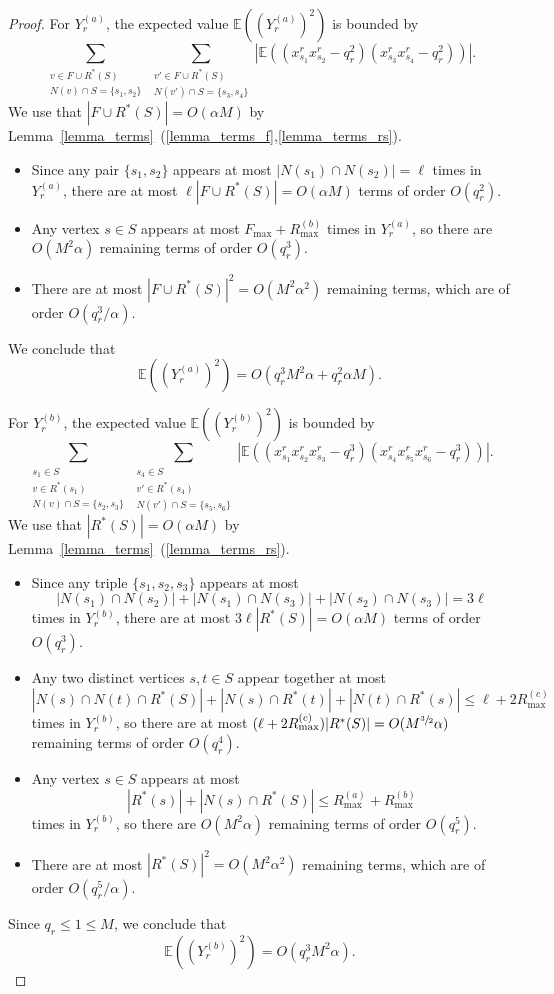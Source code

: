 \documentclass{article}
\theoremstyle{plain}
\theoremstyle{remark}
\theoremstyle{plain}
\numberwithin{equation}{section}
\begin{document}
\begin{proof}
		For $Y_r^{(a)}$, the expected value $\mathbb{E}((Y_r^{(a)})^2)$ is bounded by $$\sum_{\substack{v\in F\cup R^*(S)\\N(v)\cap S=\{s_1,s_2\}}}\sum_{\substack{v'\in F\cup R^*(S)\\N(v')\cap S=\{s_3,s_4\}}}|\mathbb{E}((x_{s_1}^rx_{s_2}^r-q_r^2)(x_{s_3}^rx_{s_4}^r-q_r^2))|.$$ We use that $|F\cup R^*(S)|=O(\alpha M)$ by Lemma~\ref{lemma_terms}~(\ref{lemma_terms_f},\ref{lemma_terms_rs}).
		\begin{itemize}
			\item Since any pair $\{s_1,s_2\}$ appears at most $|N(s_1)\cap N(s_2)|=\ell$ times in $Y_r^{(a)}$, there are at most $\ell|F\cup R^*(S)|=O(\alpha M)$ terms of order $O(q_r^2)$.
			\item Any vertex $s\in S$ appears at most $F_{\max}+R_{\max}^{(b)}$ times in $Y_r^{(a)}$, so there are $O(M^2\alpha)$ remaining terms of order $O(q_r^3)$.
			\item There are at most $|F\cup R^*(S)|^2=O(M^2\alpha^2)$ remaining terms, which are of order $O(q_r^3/\alpha)$.
		\end{itemize}
		We conclude that $$\mathbb{E}((Y_r^{(a)})^2)=O(q_r^3M^2\alpha+q_r^2\alpha M).$$
		
		For $Y_r^{(b)}$, the expected value $\mathbb{E}((Y_r^{(b)})^2)$ is bounded by $$\sum_{\substack{s_1\in S\\v\in R^*(s_1)\\N(v)\cap S=\{s_2,s_3\}}}\sum_{\substack{s_4\in S\\v'\in R^*(s_4)\\N(v')\cap S=\{s_5,s_6\}}}|\mathbb{E}((x_{s_1}^rx_{s_2}^rx_{s_3}^r-q_r^3)(x_{s_4}^rx_{s_5}^rx_{s_6}^r-q_r^3))|.$$ We use that $|R^*(S)|=O(\alpha M)$ by Lemma~\ref{lemma_terms}~(\ref{lemma_terms_rs}).
		\begin{itemize}
			\item Since any triple $\{s_1,s_2,s_3\}$ appears at most $$|N(s_1)\cap N(s_2)|+|N(s_1)\cap N(s_3)|+|N(s_2)\cap N(s_3)|=3\ell$$ times in $Y_r^{(b)}$, there are at most $3\ell|R^*(S)|=O(\alpha M)$ terms of order $O(q_r^3)$.
			\item Any two distinct vertices $s,t\in S$ appear together at most $$|N(s)\cap N(t)\cap R^*(S)|+|N(s)\cap R^*(t)|+|N(t)\cap R^*(s)|\leq\ell+2R_{\max}^{(c)}$$ times in $Y_r^{(b)}$, so there are at most $(\ell+2R_{\max}^{(c)})|R^*(S)|=O(M^{\sfrac32}\alpha)$ remaining terms of order $O(q_r^4)$.
			\item Any vertex $s\in S$ appears at most $$|R^*(s)|+|N(s)\cap R^*(S)|\leq R_{\max}^{(a)}+R_{\max}^{(b)}$$ times in $Y_r^{(b)}$, so there are $O(M^2\alpha)$ remaining terms of order $O(q_r^5)$.
			\item There are at most $|R^*(S)|^2=O(M^2\alpha^2)$ remaining terms, which are of order $O(q_r^5/\alpha)$.
		\end{itemize}
		Since $q_r\leq1\leq M$, we conclude that $$\mathbb{E}((Y_r^{(b)})^2)=O(q_r^3M^2\alpha).$$
		

\end{proof}
\end{document}

